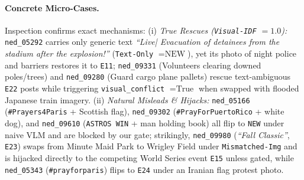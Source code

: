 \paragraph{Concrete Micro-Cases.}
Inspection confirms exact mechanisms: (i) \emph{True Rescues (\texttt{Visual-IDF} $=1.0$):} \texttt{ned\_05292} carries only generic text \emph{``Live| Evacuation of detainees from the stadium after the explosion!''} (\texttt{Text-Only} $= \text{NEW}$), yet its photo of night police and barriers restores it to \texttt{E11}; \texttt{ned\_09331} (Volunteers clearing downed poles/trees) and \texttt{ned\_09280} (Guard cargo plane pallets) rescue text-ambiguous \texttt{E22} posts while triggering \texttt{visual\_conflict} $= \text{True}$ when swapped with flooded Japanese train imagery. (ii) \emph{Natural Misleads \& Hijacks:} \texttt{ned\_05166} (\texttt{\#Prayers4Paris} + Scottish flag), \texttt{ned\_09302} (\texttt{\#PrayForPuertoRico} + white dog), and \texttt{ned\_09610} (\texttt{ASTROS WIN} + man holding book) all flip to \texttt{NEW} under naive VLM and are blocked by our gate; strikingly, \texttt{ned\_09980} (\emph{``Fall Classic''}, \texttt{E23}) swaps from Minute Maid Park to Wrigley Field under \texttt{Mismatched-Img} and is hijacked directly to the competing World Series event \texttt{E15} unless gated, while \texttt{ned\_05343} (\texttt{\#prayforparis}) flips to \texttt{E24} under an Iranian flag protest photo.
